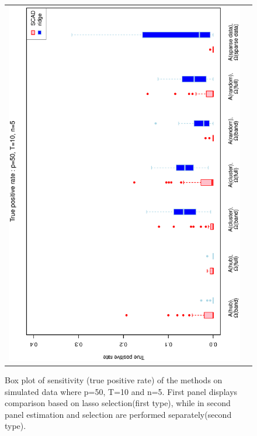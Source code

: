 \documentclass[a4paper]{article}
\begin{document}
\begin{figure}[h!]
\begin{tabular}{cc}
\includegraphics[scale=0.5,angle=270]{ROCtpr50T10N5b.eps}\\
\end{tabular}
\caption{Box plot of sensitivity (true positive rate) of the methods on simulated data where p=50, T=10 and n=5. First panel displays comparison based on lasso selection(first type), while in second panel estimation and selection are performed separately(second type).}
\label{fig:tpr25T10N5}
\end{figure}
\end{document}
